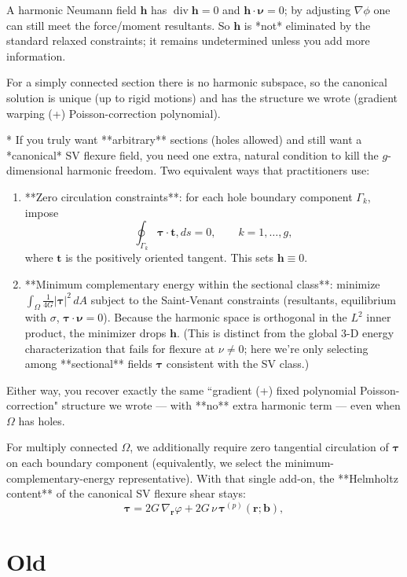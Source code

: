 A harmonic Neumann field $\bm h$ has $\operatorname{div}\bm h=0$ and $\bm h\cdot\bm\nu=0$; by adjusting $\nabla\phi$ one can still meet the force/moment resultants. 
So $\bm h$ is *not* eliminated by the standard relaxed constraints; it remains undetermined unless you add more information.


For a simply connected section there is no harmonic subspace, so the canonical solution is unique (up to rigid motions) and has the structure we wrote (gradient warping (+) Poisson-correction polynomial).

* If you truly want **arbitrary** sections (holes allowed) and still want a *canonical* SV flexure field, you need one extra, natural condition to kill the $g$-dimensional harmonic freedom. 
Two equivalent ways that practitioners use:
\begin{enumerate}
\item **Zero circulation constraints**: for each hole boundary component $\Gamma_k$, impose
     \[
     \oint_{\Gamma_k} \bm\tau\cdot\bm t,ds = 0,\qquad k=1,\dots,g,
     \]
     where $\bm t$ is the positively oriented tangent. This sets $\bm h\equiv 0$.
\item **Minimum complementary energy within the sectional class**: minimize $\int_\Omega \tfrac{1}{4G}\lvert \bm\tau\rvert^2 \,dA$ subject to the Saint-Venant constraints (resultants, equilibrium with $\sigma$, $\bm\tau\cdot\bm\nu=0$). Because the harmonic space is orthogonal in the $L^2$ inner product, the minimizer drops $\bm{h}$.
     (This is distinct from the global 3-D energy characterization that fails for flexure at $\nu\neq 0$; here we’re only selecting among **sectional** fields $\bm\tau$ consistent with the SV class.)
\end{enumerate}

Either way, you recover exactly the same ``gradient (+) fixed polynomial Poisson-correction" structure we wrote — with **no** extra harmonic term — even when $\Omega$ has holes.

For multiply connected $\Omega$, we additionally require zero tangential circulation of $\bm\tau$ on each boundary component (equivalently, we select the minimum-complementary-energy representative).
With that single add-on, the **Helmholtz content** of the canonical SV flexure shear stays:
\[
\bm\tau = 2G\,\nabla_{\!\bm{r}}\varphi + 2G\,\nu\,\bm\tau^{(p)}(\bm{r};\bm b),
\]


\section{Old}



